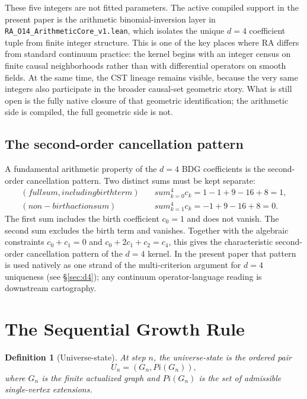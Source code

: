 \documentclass[11pt]{article}
\def\Pi{Pi}%
\def\text#1{#1}%
\def\sum{sum}%
\newtheorem{definition}{Definition}
\newcommand{\Pot}{\Pi}
\begin{document}
These five integers are not fitted parameters. The active compiled support in the present paper is the arithmetic binomial-inversion layer in \texttt{RA\_O14\_ArithmeticCore\_v1.lean}, which isolates the unique $d=4$ coefficient tuple from finite integer structure. This is one of the key places where RA differs from standard continuum practice: the kernel begins with an integer census on finite causal neighborhoods rather than with differential operators on smooth fields. At the same time, the CST lineage remains visible, because the very same integers also participate in the broader causal-set geometric story. What is still open is the fully native closure of that geometric identification; the arithmetic side is compiled, the full geometric side is not.

\subsection{The second-order cancellation pattern}

A fundamental arithmetic property of the $d=4$ BDG coefficients is the second-order cancellation pattern. Two distinct sums must be kept separate:
\begin{align}
\label{eq:full_sum}
\text{(full sum, including birth term)}\quad & \sum_{k=0}^{4} c_k = 1-1+9-16+8 = 1,\\
\label{eq:dalembert_sum}
\text{(non-birth action sum)}\quad & \sum_{k=1}^{4} c_k = -1+9-16+8 = 0.
\end{align}
The first sum includes the birth coefficient $c_0=1$ and does not vanish. The second sum excludes the birth term and vanishes. Together with the algebraic constraints $c_0+c_1=0$ and $c_0+2c_1+c_2=c_4$, this gives the characteristic second-order cancellation pattern of the $d=4$ kernel. In the present paper that pattern is used natively as one strand of the multi-criterion argument for $d=4$ uniqueness (see \S\ref{sec:d4}); any continuum operator-language reading is downstream cartography.

\section{The Sequential Growth Rule}
\label{sec:engine}

\begin{definition}[Universe-state]
At step $n$, the universe-state is the ordered pair
\begin{equation}
U_n=(G_n,\Pot(G_n)),
\end{equation}
where $G_n$ is the finite actualized graph and $\Pot(G_n)$ is the set of admissible single-vertex extensions.
\end{definition}
\end{document}

